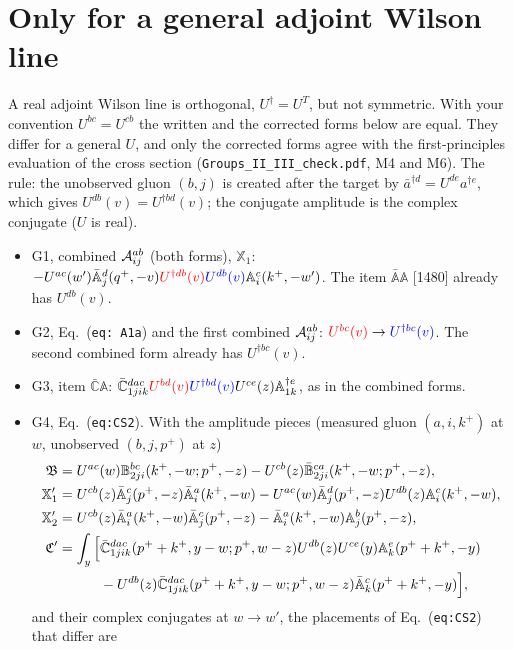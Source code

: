 \documentclass[10pt]{article}
\def\mf#1{\mathbb{#1}}
\newcommand{\old}[1]{{\color{red}#1}}
\newcommand{\new}[1]{{\color{blue}#1}}
\newcommand{\eqn}[1]{Eq.~(\texttt{#1})}
\begin{document}
\section{Only for a general adjoint Wilson line}\label{sec:G}
A real adjoint Wilson line is orthogonal, $U^\dagger=U^T$, but not symmetric. With your convention $U^{bc}=U^{cb}$ the written and the corrected forms below are equal. They differ for a general $U$, and only the corrected forms agree with the first-principles evaluation of the cross section (\texttt{Groups\_II\_III\_check.pdf}, M4 and M6). The rule: the unobserved gluon $(b,j)$ is created after the target by $\bar a^{\dagger d}=U^{de}a^{\dagger e}$, which gives $U^{db}(v)=U^{\dagger bd}(v)$; the conjugate amplitude is the complex conjugate ($U$ is real).
\begin{itemize}
\item G1, combined ${\cal A}^{ab}_{ij}$ (both forms), $\mathbb X_1$: $-U^{ac}(w')\bar{\mf A}^d_{j}(q^+,-v)\old{U^{\dagger db}(v)}\new{U^{db}(v)}\mf A^c_i(k^+,-w')$. The item $\bar{\mf A}\mf A$ [1480] already has $U^{db}(v)$.
\item G2, \eqn{eq: A1a} and the first combined ${\cal A}^{ab}_{ij}$: $\old{U^{bc}(v)}\to\new{U^{\dagger bc}(v)}$. The second combined form already has $U^{\dagger bc}(v)$.
\item G3, item $\bar{\mf C}\mf A$: $\bar{\mf C}^{dac}_{1jik}\old{U^{bd}(v)}\new{U^{\dagger bd}(v)}U^{ce}(z)\mf A^{\dagger e}_{1k}$, as in the combined forms.
\item G4, \eqn{eq:CS2}. With the amplitude pieces (measured gluon $(a,i,k^+)$ at $w$, unobserved $(b,j,p^+)$ at $z$)
\begin{align}
\mathfrak B&=U^{ac}(w)\mf B^{bc}_{2ji}(k^+,-w;p^+,-z)-U^{cb}(z)\bar{\mf B}^{ca}_{2ji}(k^+,-w;p^+,-z),\notag\\
\mathbb X'_1&=U^{cb}(z)\bar{\mf A}^c_j(p^+,-z)\bar{\mf A}^a_i(k^+,-w)-U^{ac}(w)\bar{\mf A}^d_j(p^+,-z)U^{db}(z)\mf A^c_i(k^+,-w),\notag\\
\mathbb X'_2&=U^{cb}(z)\bar{\mf A}^a_i(k^+,-w)\bar{\mf A}^c_j(p^+,-z)-\bar{\mf A}^a_i(k^+,-w)\mf A^b_j(p^+,-z),\notag\\
\mathfrak C'&=\int_y\Big[\bar{\mf C}^{dac}_{1jik}(p^++k^+,y-w;p^+,w-z)U^{db}(z)U^{ce}(y)\mf A^e_k(p^++k^+,-y)\notag\\
&\hspace{3em}-U^{db}(z)\bar{\mf C}^{dac}_{1jik}(p^++k^+,y-w;p^+,w-z)\bar{\mf A}^c_k(p^++k^+,-y)\Big],
\end{align}
and their complex conjugates at $w\to w'$, the placements of \eqn{eq:CS2} that differ are

\end{itemize}
\end{document}

